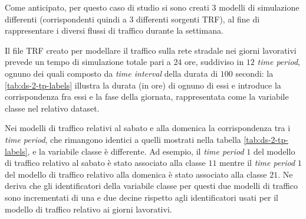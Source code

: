 Come anticipato, per questo caso di studio si sono creati $3$ modelli di simulazione differenti (corrispondenti quindi a $3$ differenti sorgenti \acs{TRF}), al fine di rappresentare i diversi flussi di traffico durante la settimana.

Il file \acs{TRF} creato per modellare il traffico sulla rete stradale nei giorni lavorativi prevede un tempo di simulazione totale pari a $24$ ore, suddiviso in $12$ \emph{time period}, ognuno dei quali composto da \emph{time interval} della durata di $100$ secondi: la \vref{tab:ds-2-tp-labels} illustra la durata (in ore) di ognuno di essi e introduce la corrispondenza fra essi e la fase della giornata, rappresentata come la variabile classe nel relativo dataset.

Nei modelli di traffico relativi al sabato e alla domenica la corrispondenza tra i \emph{time period}, che rimangono identici a quelli mostrati nella tabella \vref{tab:ds-2-tp-labels}, e la variabile classe è differente. Ad esempio, il \emph{time period} $1$ del modello di traffico relativo al sabato è stato associato alla classe $11$ mentre il \emph{time period} $1$ del modello di traffico relativo alla domenica è stato associato alla classe $21$. Ne deriva che gli identificatori della variabile classe per questi due modelli di traffico sono incrementati di una e due decine rispetto agli identificatori usati per il modello di traffico relativo ai giorni lavorativi.
